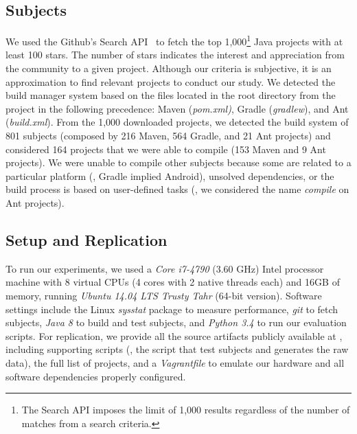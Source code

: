 
\subsection{Subjects}
\label{sec:subjects}

We used the Github's
Search API~\cite{githubsearch} to fetch the top 1,000\footnote{The
Search API imposes the limit of 1,000 results regardless of the number
of matches from a search criteria.} Java projects with at least 100
stars. The number of stars indicates the interest and appreciation
from the community to a given project.
 Although our
criteria is subjective, it is an approximation to find relevant
projects to conduct our study. We detected the build manager system
based on the files located in the root directory from the project in
the following precedence: Maven (\emph{pom.xml)}, Gradle
(\emph{gradlew}), and Ant (\emph{build.xml}).
From the 1,000 downloaded projects, we detected the build system of
801 subjects (composed by 216 Maven, 564 Gradle, and 21 Ant projects)
and considered 164 projects that we were able to compile (153 Maven
and 9 Ant projects).  We were unable to compile other subjects because
some are related to a particular platform (\eg, Gradle implied
Android), unsolved dependencies, or the build process is based on
user-defined tasks (\eg, we considered the name \emph{compile} on Ant
projects).

\subsection{Setup and Replication}
\label{sec:setup}

To run our experiments, we used a \emph{Core i7-4790} (3.60 GHz) Intel
processor machine with 8 virtual CPUs (4 cores with 2 native threads
each) and 16GB of memory, running \emph{Ubuntu 14.04 LTS Trusty Tahr}
(64-bit version). Software settings include the Linux \emph{sysstat}
package to measure performance, \emph{git} to fetch subjects,
\emph{Java 8} to build and test subjects, and \emph{Python 3.4} to run
our evaluation scripts. For replication, we provide all the source
artifacts publicly available at , including
supporting scripts (\eg, the script that test subjects and generates
the raw data), the full list of projects, and a \emph{Vagrantfile} to
emulate our hardware and all software dependencies properly configured.

